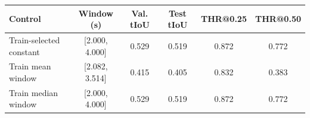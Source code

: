 \begin{tabular}{lccccc}
\toprule
Control & Window (s) & Val. tIoU & Test tIoU & THR@0.25 & THR@0.50 \\
\midrule
Train-selected constant & [2.000, 4.000] & 0.529 & 0.519 & 0.872 & 0.772 \\
Train mean window & [2.082, 3.514] & 0.415 & 0.405 & 0.832 & 0.383 \\
Train median window & [2.000, 4.000] & 0.529 & 0.519 & 0.872 & 0.772 \\
\bottomrule
\end{tabular}
